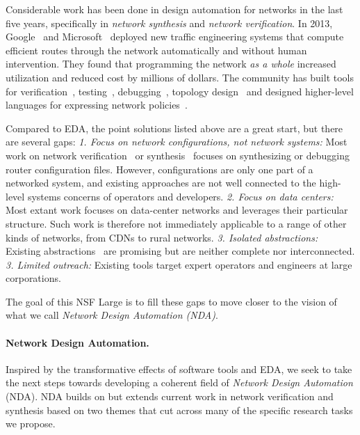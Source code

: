 Considerable work has been done in design automation for networks in the last five years, specifically in {\em network synthesis} and \emph{network verification}.  In 2013, Google~\cite{b4} and Microsoft~\cite{swan} deployed new traffic engineering systems that compute efficient routes through the network automatically and without human intervention. They found that programming the network {\em as a whole} increased utilization and reduced cost by millions of dollars. The community has built tools for verification~\cite{veriflow,hsa,lam}, testing~\cite{atpg,nice}, debugging~\cite{xtrace,marple}, topology design~\cite{condor} and designed higher-level languages for expressing network policies~\cite{netkat,propane}.

Compared to EDA, the point solutions listed above are a great start, but there are several gaps: {\em 1. Focus on network configurations, not network systems:}  Most work on
network verification~\cite{hsa,veriflow,minesweeper} or synthesis~\cite{netkat,propane} focuses
on synthesizing or debugging router configuration files.  However, configurations are only one part of a networked system, and existing approaches are not well connected to the high-level systems concerns of operators and developers.   
{\em 2. Focus on data centers:} Most extant work focuses on data-center networks and leverages their particular structure.  Such work is therefore not immediately applicable to a range of other kinds of networks, from CDNs to rural networks.  {\em 3. Isolated abstractions:} Existing
abstractions~\cite{netkat,propane,hsa,Ethane,4DControlPlane} are promising but are neither
complete nor interconnected.  {\em 3. Limited outreach:} Existing tools target expert operators and engineers at large corporations.

The goal of this NSF Large is to fill these gaps to move closer to the vision of what we call \emph{Network Design Automation (NDA)}.

\paragraph*{Network Design Automation.}
%
Inspired by the transformative effects of software tools and EDA, we seek to take the next steps towards developing a coherent field of {\em Network Design Automation} (NDA). NDA
builds on but extends current work in network verification and synthesis based on two
themes that cut across many of the specific research tasks we propose.

